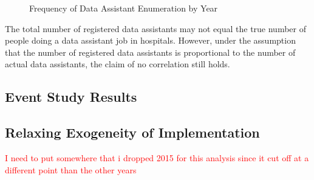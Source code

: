 \documentclass[11pt]{article}
\begin{document}
\vspace{5mm}
\begin{figure}[ht]
\caption{Frequency of Data Assistant Enumeration by Year}

    \label{fig:dataassistant_histogram}
\end{figure}

The total number of registered data assistants may not equal the true number of people doing a data assistant job in hospitals. However, under the assumption that the number of registered data assistants is proportional to the number of actual data assistants, the claim of no correlation still holds. 


\subsection{Event Study Results}






\subsection{Relaxing Exogeneity of Implementation}


\textcolor{red}{I need to put somewhere that i dropped 2015 for this analysis since it cut off at a different point than the other years}

\renewcommand*{\bibfont}{\footnotesize}

\printbibliography

\newpage

\appendix

\section{}
\end{document}
